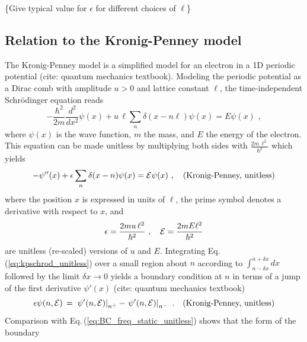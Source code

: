 \color{red}
\{Give typical value for $\epsilon$ for different choices of $\ell$\}
\color{black}


\subsection{Relation to the Kronig-Penney model}
\label{subsec:kp}

The Kronig-Penney model is a simplified model for an electron in a 1D 
periodic potential
\color{red}
(cite: quantum mechanics textbook).
\color{black}
Modeling the periodic potential as a Dirac comb with amplitude $u>0$
and lattice constant $\ell$, the time-independent Schr\"odinger equation reads
%
\begin{equation} \label{eq:kpschrod}
- \frac{\hbar^2}{2 m} \frac{d^2}{dx^2} \psi(x) + u \, \ell \sum_n \delta(x - n \ell) \psi(x) = E \psi(x) \, \, , 
\end{equation}
%
where $\psi(x)$ is the wave function, $m$ the mass, and $E$ the energy 
of the electron.
This equation can be made unitless by multiplying both sides
with $\displaystyle \frac{2 m \, \ell^2}{\hbar^2}$ which yields
%
\begin{equation} \label{eq:kpschrod_unitless}
- \psi''(x) + \epsilon \sum_n \delta(x - n) \psi(x) = {\cal E} \psi(x) \, \, , \quad \text{(Kronig-Penney, unitless)} 
\end{equation}
%
where the position $x$ is expressed in units of $\ell$, the prime symbol denotes a derivative
with respect to $x$, and
%
\begin{equation} \label{eq:kpschrod_param}
\epsilon = \frac{2 m u \, \ell^2}{\hbar^2} \, \, , \quad {\cal E} = \frac{2 m E \ell^2}{\hbar^2}
\end{equation}
%
are unitless (re-scaled) versions of $u$ and $E$.
Integrating Eq.\,(\ref{eq:kpschrod_unitless}) over a small region about  
$n$ according to $\displaystyle \int_{n - \delta x}^{n + \delta x} dx$ \,
followed by the limit $\delta x \to 0$ yields
a boundary condition at $n$ in terms of a jump of the first derivative $\psi'(x)$
\color{red}
(cite: quantum mechanics textbook)
\color{black}
%
\begin{equation}\label{eq:kpjump}
\epsilon \psi(n,{\cal E}) \, = \, 
\left. \psi'(n,{\cal E}) \right|_{n^{+}} - \left. \psi'(n,{\cal E}) \right|_{n^{-}} \, \, .
\quad \text{(Kronig-Penney, unitless)}
\end{equation}
%
Comparison with Eq.\,(\ref{eq:BC_freq_static_unitless}) shows that the form of the boundary
